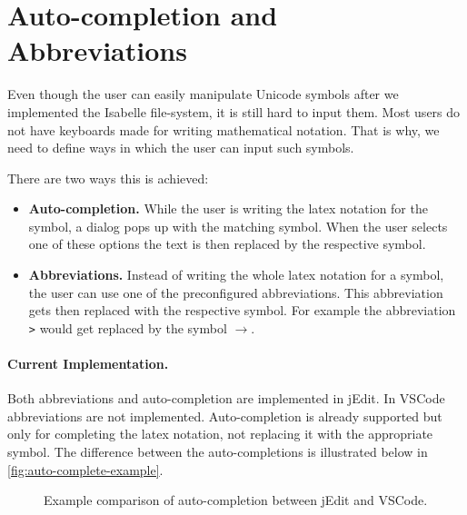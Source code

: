 \section{Auto-completion and Abbreviations}
\label{section:abbrevs}

Even though the user can easily manipulate Unicode symbols after we implemented the Isabelle file-system, it is still hard to input them. Most users do not have keyboards made for writing mathematical notation. That is why, we need to define ways in which the user can input such symbols.

There are two ways this is achieved:
\begin{itemize}
    \item\textbf{Auto-completion.} While the user is writing the latex notation for the symbol, a dialog pops up with the matching symbol. When the user selects one of these options the text is then replaced by the respective symbol.
    \item\textbf{Abbreviations.} Instead of writing the whole latex notation for a symbol, the user can use one of the preconfigured abbreviations. This abbreviation gets then replaced with the respective symbol. For example the abbreviation \texttt{\textendash\textendash>} would get replaced by the symbol $\rightarrow$.
\end{itemize}

\paragraph{Current Implementation.}
Both abbreviations and auto-completion are implemented in jEdit. In VSCode abbreviations are not implemented. Auto-completion is already supported but only for completing the latex notation, not replacing it with the appropriate symbol. The difference between the auto-completions is illustrated below in \autoref{fig:auto-complete-example}.

\begin{figure}[!tbp]
    \centering
    \hfill
    \caption{Example comparison of auto-completion between jEdit and VSCode.}
    \label{fig:auto-complete-example}
\end{figure}

